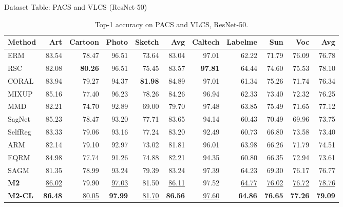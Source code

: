 \documentclass[t, aspectratio=169]{beamer} %
\begin{document}
\begin{frame}{Dataset Table: PACS and VLCS (ResNet-50)}
\begin{table}[htbp]
\centering
\caption{Top-1 accuracy on PACS and VLCS, ResNet-50.}
\scriptsize
\begin{adjustbox}{max width=\textwidth}
\begin{tabular}{lrrrrrrrrrr}
\toprule
Method & Art & Cartoon & Photo & Sketch & Avg & Caltech & Labelme & Sun & Voc & Avg \\
\midrule
ERM & 83.54 & 78.47 & 96.51 & 73.64 & 83.04 & 97.01 & 62.22 & 71.79 & 76.09 & 76.78 \\
RSC & 82.08 & \textbf{80.26} & 96.51 & 75.45 & 83.57 & \textbf{97.81} & 64.44 & 74.60 & 75.53 & 78.10 \\
CORAL & 83.94 & 79.27 & 94.37 & \textbf{81.98} & 84.89 & 97.01 & 61.34 & 75.26 & 71.74 & 76.34 \\
MIXUP & 85.16 & 77.40 & 96.23 & 78.26 & 84.26 & 96.94 & 62.33 & 73.40 & 72.32 & 76.25 \\
MMD & 82.21 & 74.70 & 92.89 & 69.00 & 79.70 & 97.48 & 63.85 & 75.49 & 71.65 & 77.12 \\
SagNet & 85.23 & 78.47 & 93.20 & 77.71 & 83.65 & 94.14 & 60.43 & 70.49 & 69.96 & 73.75 \\
SelfReg & 83.33 & 79.06 & 93.16 & 77.24 & 83.20 & 92.49 & 60.73 & 66.80 & 73.58 & 73.40 \\
ARM & 82.14 & 79.10 & 92.97 & 73.02 & 81.81 & 96.01 & 63.98 & 66.26 & 71.79 & 74.51 \\
EQRM & 84.98 & 77.74 & 91.26 & 74.88 & 82.21 & 94.35 & 60.80 & 66.35 & 72.94 & 73.61 \\
SAGM & 81.35 & 78.99 & 93.24 & 79.39 & 83.24 & 97.39 & 64.23 & 69.30 & 76.17 & 76.77 \\
\midrule
\textbf{M2} & \underline{86.02} & 79.90 & \underline{97.03} & 81.50 & \underline{86.11} & 97.52 & \underline{64.77} & \underline{76.02} & \underline{76.72} & \underline{78.76} \\
\textbf{M2-CL} & \textbf{86.48} & \underline{80.05} & \textbf{97.99} & \underline{81.70} & \textbf{86.56} & \underline{97.60} & \textbf{64.86} & \textbf{76.65} & \textbf{77.26} & \textbf{79.09} \\
\bottomrule
\end{tabular}
\end{adjustbox}
\end{table}
	\end{frame}
\end{document}
